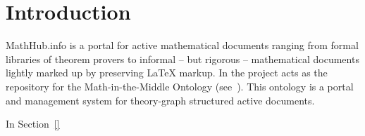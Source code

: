 \section{Introduction}\label{sec:intro}

MathHub.info is a portal for active mathematical documents ranging from formal libraries
of theorem provers to informal -- but rigorous -- mathematical documents lightly marked up
by preserving {\LaTeX} markup. In the \pn project \sys acts as the repository for the
Math-in-the-Middle Ontology (see~\cite{DehKohKon:iop16,ODK-D6.2}). This ontology is a
portal and management system for theory-graph structured active documents. 

In Section~\ref{}

